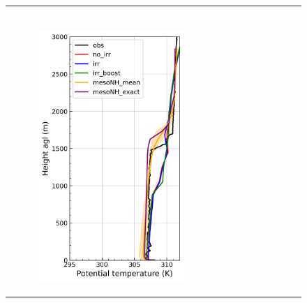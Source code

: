 \begin{figure}[hbtp]
{\begin{tabular}{@{}cccc@{}}
\begin{subfigure}[t]{0.283\textwidth}
        \end{subfigure} \\
        \begin{subfigure}[t]{0.382\textwidth}
            \caption{}
            \includegraphics[width=\textwidth]{images/chap5/profiles/profile_elsplans_theta_2007_.png}
        \end{subfigure} &
        \begin{subfigure}[t]{0.289\textwidth}
            \caption{}

\end{subfigure}
\end{tabular}}
\end{figure}
